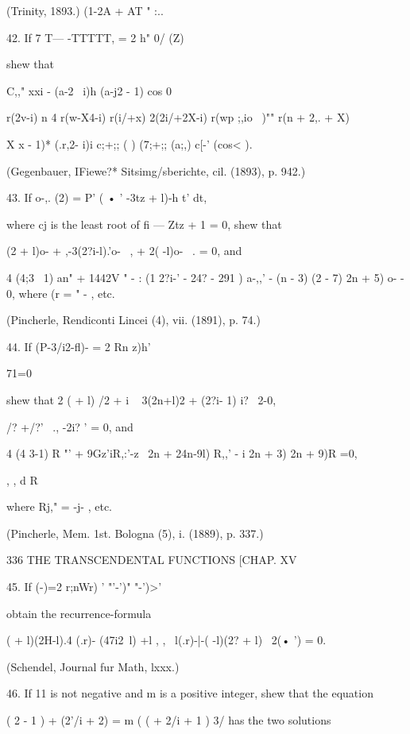 {{{{(Trinity, 1893.) 
(1-2A + AT " :..  



42. If 7 T— -TTTTT, = 2 h" 0/ (Z) 



shew that 



C,,"  xxi - (a-2 \  i)h (a-j2 - 1)  cos 0  



  r(2v-i) n   4 r(w-X4-i) r(i/+x) 2(2i/+2X-i) 
 r(wp ;,io ~)"" r(n + 2,. + X) 

X  x - 1)*  (.r,2- i)i  c;+;; ( ) (7;+;; (a;,) c[-'  (cos< ). 

(Gegenbauer, IFiewe?* Sitsimg/sberichte, cil. (1893), p. 942.) 

43. If o-,. (2) = P' ( • ' -3tz + l)-h t' dt, 

where cj is the least root of fi — Ztz + 1 = 0, shew that 

(2  + l)o-  + ,-3(2?i-l).'o- \ , + 2( -l)o- \ .  = 0, 
and 

4 (4;3 \  1) an" + 1442V " - : (1 2?i-' - 24?  - 291 ) a-,,' - (n - 3) (2  - 7)  2n + 5) o-  - 0, 
where (r  = " - , etc. 

(Pincherle, Rendiconti Lincei (4), vii. (1891), p. 74.) 

44. If (P-3/i2-fl)- = 2 Rn z)h'\ 

71=0 

shew that 2 (  + l) /2  + i ~ 3(2n+l)2   + (2?i- 1) i? \ 2-0, 

 /? +/?' \ ., -2i? ' = 0, 
and 

4 (4 3-1) R "' + 9Gz'iR,:'-z  \ 2n  + 24n-9l) R,,' - i 2n + 3)  2n + 9)R =0, 

,   ,  d R  

where Rj," = -j-  , etc. 

(Pincherle, Mem. 1st. Bologna (5), i. (1889), p. 337.) 



336 THE TRANSCENDENTAL FUNCTIONS [CHAP. XV 

45. If   (-)=2 r;nWr) ' "'-')" "-')>' 

obtain the recurrence-formula 

(  + l)(2H-l).4 (.r)- (47i2\ l)  +l , , \ l(.r)-|-( -l)(2?  + l)  \ 2(• ') = 0. 

(Schendel, Journal fur Math, lxxx.) 

46. If 11 is not negative and m is a positive integer, shew that the equation 

( 2 - 1 ) + (2'/i + 2)   = m (  ( + 2/i + 1 ) 3/ 
has the two solutions 

}}}}
